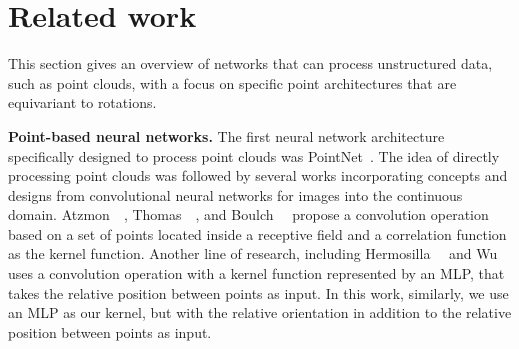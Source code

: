 \section{Related work}
\label{sec:related_work}
This section gives an overview of networks that can process unstructured data, such as point clouds, with a focus on specific point architectures that are equivariant to rotations.

\textbf{Point-based neural networks.}
The first neural network architecture specifically designed to process point clouds was PointNet~\cite{qi2017pointnet}. The idea of directly processing point clouds was followed by several works incorporating concepts and designs from convolutional neural networks for images into the continuous domain.
Atzmon~\etal~\cite{atzmon2018pccnn}, Thomas~\etal~\cite{thomas2019KPConv}, and Boulch~\etal~\cite{boulch2020convpoint} propose a convolution operation based on a set of points located inside a receptive field and a correlation function as the kernel function.
Another line of research, including Hermosilla~\etal~\cite{hermosilla2018mccnn} and Wu~\etal~\cite{wu2019pointconv} uses a convolution operation with a kernel function represented by an \ac{MLP}, that takes the relative position between points as input. 
In this work, similarly, we use an \ac{MLP} as our kernel, but with the relative orientation in addition to the relative position between points as input.

